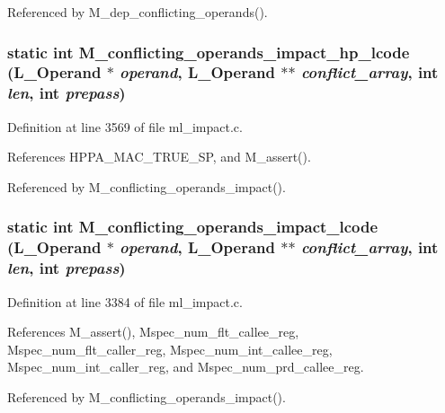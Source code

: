 Referenced by M\_\-dep\_\-conflicting\_\-operands().
\subsubsection{\setlength{\rightskip}{0pt plus 5cm}static int M\_\-conflicting\_\-operands\_\-impact\_\-hp\_\-lcode (L\_\-Operand $\ast$ {\em operand}, L\_\-Operand $\ast$$\ast$ {\em conflict\_\-array}, int {\em len}, int {\em prepass})\hspace{0.3cm}{\tt  [static]}}\label{ml__impact_8c_3845c66ea65ad64e071f7f04292d44a9}




Definition at line 3569 of file ml\_\-impact.c.

References HPPA\_\-MAC\_\-TRUE\_\-SP, and M\_\-assert().

Referenced by M\_\-conflicting\_\-operands\_\-impact().
\subsubsection{\setlength{\rightskip}{0pt plus 5cm}static int M\_\-conflicting\_\-operands\_\-impact\_\-lcode (L\_\-Operand $\ast$ {\em operand}, L\_\-Operand $\ast$$\ast$ {\em conflict\_\-array}, int {\em len}, int {\em prepass})\hspace{0.3cm}{\tt  [static]}}\label{ml__impact_8c_b770a62b39c1d11e287504714b2cfc90}




Definition at line 3384 of file ml\_\-impact.c.

References M\_\-assert(), Mspec\_\-num\_\-flt\_\-callee\_\-reg, Mspec\_\-num\_\-flt\_\-caller\_\-reg, Mspec\_\-num\_\-int\_\-callee\_\-reg, Mspec\_\-num\_\-int\_\-caller\_\-reg, and Mspec\_\-num\_\-prd\_\-callee\_\-reg.

Referenced by M\_\-conflicting\_\-operands\_\-impact().
